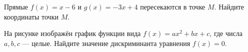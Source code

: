 \begin{homework}[number=1]
\begin{listofex}
		\item Прямые \( f(x) = x - 6 \) и \( g(x) = -3x + 4 \) пересекаются в точке \( M \). Найдите координаты точки \( M \).
		\item {}
		\item
		\begin{minipage}[t]{0.66\textwidth}
			На рисунке изображён график функции вида \(f(x)=ax^2+bx+c\), где числа \(a, b, c\) --- целые. Найдите значение дискриминанта уравнения \(f(x)=0\).
		\end{minipage}
		\hspace{0.05\textwidth}
		\begin{minipage}[t]{0.22\textwidth}

\end{minipage}
\end{listofex}
\end{homework}
